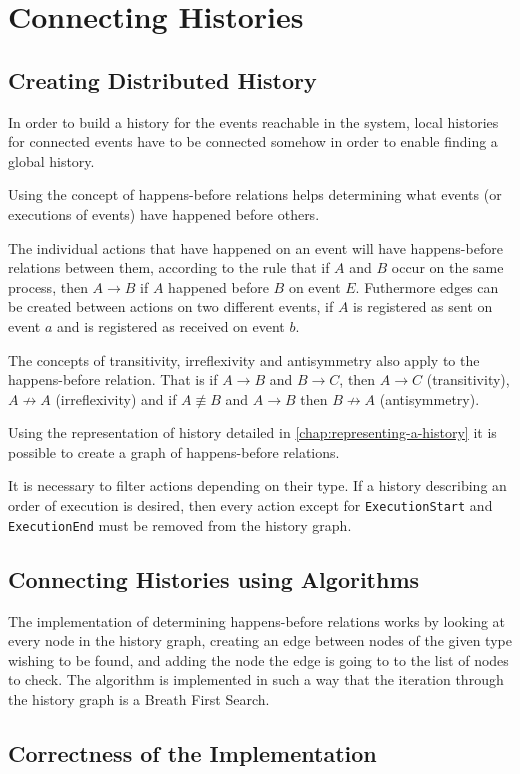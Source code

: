 \chapter{Connecting Histories} %
	\section{Creating Distributed  History} %
	In order to build a history for the events reachable in the system, local histories for connected events have to be connected somehow in order to enable finding a global history. 
	
	Using the concept of happens-before relations helps determining what events (or executions of events) have happened before others. 
	
	The individual actions that have happened on an event will have happens-before relations between them, according to the rule that if $A$ and $B$ occur on the same process, then $A \rightarrow B$ if $A$ happened before $B$ on event $E$. 
	Futhermore edges can be created between actions on two different events, if $A$ is registered as sent on event $a$ and is registered as received on event $b$.
	
	The concepts of transitivity, irreflexivity and antisymmetry also apply to the happens-before relation. That is if $A \rightarrow B$ and $B \rightarrow C$, then $A \rightarrow C$ (transitivity), $A \not\rightarrow A$ (irreflexivity) and if $A \not\equiv B$ and $A \rightarrow B$ then $B \not\rightarrow A$ (antisymmetry).
	
	Using the representation of history detailed in \ref{chap:representing-a-history} it is possible to create a graph of happens-before relations.
	
	
	It is necessary to filter actions depending on their type. If a history describing an order of execution is desired, then every action except for \texttt{ExecutionStart} and \texttt{ExecutionEnd} must be removed from the history graph. 
	
	\section{Connecting Histories using Algorithms} %
	The implementation of determining happens-before relations works by looking at every node in the history graph, creating an edge between nodes of the given type wishing to be found, and adding the node the edge is going to to the list of nodes to check. The algorithm is implemented in such a way that the iteration through the history graph is a Breath First Search. 
	
	\section{Correctness of the Implementation} %
	